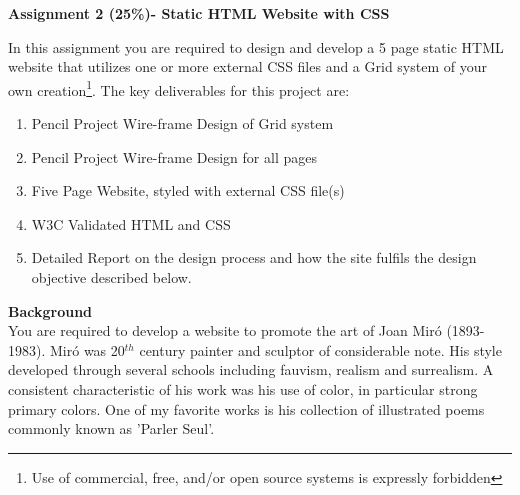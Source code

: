 
	
\begin{flushleft}
\Large\textbf{Assignment 2 (25\%)- Static HTML Website with CSS}\\
\end{flushleft}

In this assignment you are required to design and develop a 5 page static HTML website that utilizes one or more external CSS files and a Grid system of your own creation\footnote{Use of commercial, free, and/or open source systems is expressly forbidden}. The key deliverables for this project are:

\begin{enumerate}
	\item Pencil Project Wire-frame Design of Grid system
	\item Pencil Project Wire-frame Design for all pages
	\item Five Page Website, styled with external CSS file(s)
	\item W3C Validated HTML and CSS
	\item Detailed Report on the design process and how the site fulfils the design objective described below.
\end{enumerate}


\textbf{Background}\\

You are required to develop a website to promote the art of Joan Mir\'{o} (1893-1983).  Mir\'{o} was 20$^{th}$ century painter and sculptor of considerable note.  His style developed through several schools including fauvism, realism and surrealism.  A consistent characteristic of his work was his use of color, in particular strong primary colors.  One of my favorite works is his collection of illustrated poems commonly known as 'Parler Seul'.\\



